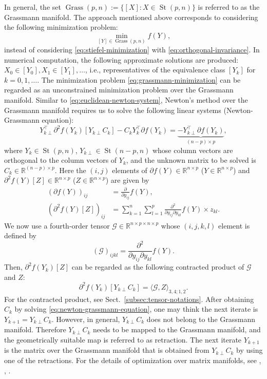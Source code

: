 {In general, the set $\operatorname{Grass}(p,n):=\{[X]:X\in\operatorname{St}(p,n)\}$ is referred to as the Grassmann manifold. The approach mentioned above corresponds to considering the following minimization problem:}
\begin{equation}\label{eq:grassmann-minimization}
\min_{[Y]\in\operatorname{Grass}(p,n)}f(Y),
\end{equation}
{instead of considering \eqref{eq:stiefel-minimization} with \eqref{eq:orthogonal-invariance}. In numerical computation, the following approximate solutions are produced: $X_0\in[Y_0],X_1\in[Y_1],\ldots$, i.e., representatives of the equivalence class $[Y_k]$ for $k=0,1,\ldots$.}
{The minimization problem \eqref{eq:grassmann-minimization} can be regarded as an unconstrained minimization problem over the Grassmann manifold. Similar to \eqref{eq:euclidean-newton-system}, Newton's method over the Grassmann manifold requires us to solve the following linear systems (Newton-Grassmann equation):}
\begin{equation}\label{eq:newton-grassmann-equation}
Y_{k\perp}^{\top}\partial^2f(Y_k)[Y_{k\perp}C_k]-C_kY_k^{\top}\partial f(Y_k)
=\underbrace{-Y_{k\perp}^{\top}\partial f(Y_k)}_{(n-p)\times p},
\end{equation}
{where $Y_k\in\operatorname{St}(p,n)$, $Y_{k\perp}\in\operatorname{St}(n-p,n)$ whose column vectors are orthogonal to the column vectors of $Y_k$, and the unknown matrix to be solved is $C_k\in\mathbb{R}^{(n-p)\times p}$. Here the $(i,j)$ elements of $\partial f(Y)\in\mathbb{R}^{n\times p}$ ($Y\in\mathbb{R}^{n\times p}$) and $\partial^2f(Y)[Z]\in\mathbb{R}^{n\times p}$ ($Z\in\mathbb{R}^{n\times p}$) are given by}
\[\begin{aligned}
(\partial f(Y))_{ij}&=\frac{\partial}{\partial y_{ij}}f(Y),\\
(\partial^2f(Y)[Z])_{ij}&=\sum_{k=1}^n\sum_{l=1}^p\frac{\partial^2}{\partial y_{ij}\partial y_{kl}}f(Y)\times z_{kl}.
\end{aligned}\]
{We now use a fourth-order tensor $\mathcal{G}\in\mathbb{R}^{n\times p\times n\times p}$ whose $(i,j,k,l)$ element is defined by}
\[(\mathcal{G})_{ijkl}=\frac{\partial^2}{\partial y_{ij}\partial y_{kl}}f(Y).\]
{Then, $\partial^2f(Y_k)[Z]$ can be regarded as the following contracted product of $\mathcal{G}$ and $Z$:}
\[\partial^2f(Y_k)[Y_{k\perp}C_k]=\langle\mathcal{G},Z\rangle_{3,4;1,2}.\]
{For the contracted product, see Sect.\ \ref{subsec:tensor-notations}. After obtaining $C_k$ by solving \eqref{eq:newton-grassmann-equation}, one may think the next iterate is $Y_{k+1}=Y_{k\perp}C_k$. However, in general, $Y_{k\perp}C_k$ does not belong to the Grassmann manifold. Therefore $Y_{k\perp}C_k$ needs to be mapped to the Grassmann manifold, and the geometrically suitable map is referred to as retraction. The next iterate $Y_{k+1}$ is the matrix over the Grassmann manifold that is obtained from $Y_{k\perp}C_k$ by using one of the retractions. For the details of optimization over matrix manifolds, see , , .}
